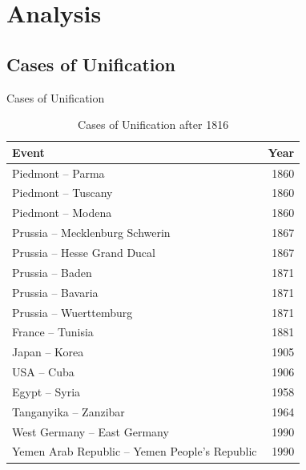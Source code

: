 \documentclass{beamer}
\begin{document}
	\section{Analysis}
	\subsection{Cases of Unification}
	\begin{frame}{Cases of Unification}
		\begin{table}
			\centering
			\footnotesize
			\caption{Cases of Unification after 1816}
			\begin{tabular}{lr}
				\toprule
				Event & Year \\
				\midrule
				Piedmont -- Parma & 1860 \\
				Piedmont -- Tuscany & 1860 \\
				Piedmont -- Modena & 1860 \\
				Prussia -- Mecklenburg Schwerin & 1867 \\
				Prussia -- Hesse Grand Ducal & 1867 \\
				Prussia -- Baden & 1871 \\
				Prussia -- Bavaria & 1871 \\
				Prussia -- Wuerttemburg & 1871 \\
				France -- Tunisia & 1881 \\
				Japan -- Korea & 1905 \\
				USA -- Cuba & 1906 \\
				Egypt -- Syria & 1958 \\
				Tanganyika -- Zanzibar & 1964 \\
				West Germany -- East Germany & 1990 \\
				Yemen Arab Republic -- Yemen People's Republic & 1990 \\
				\bottomrule
			\end{tabular}
		\end{table}
	\end{frame}
\end{document}
